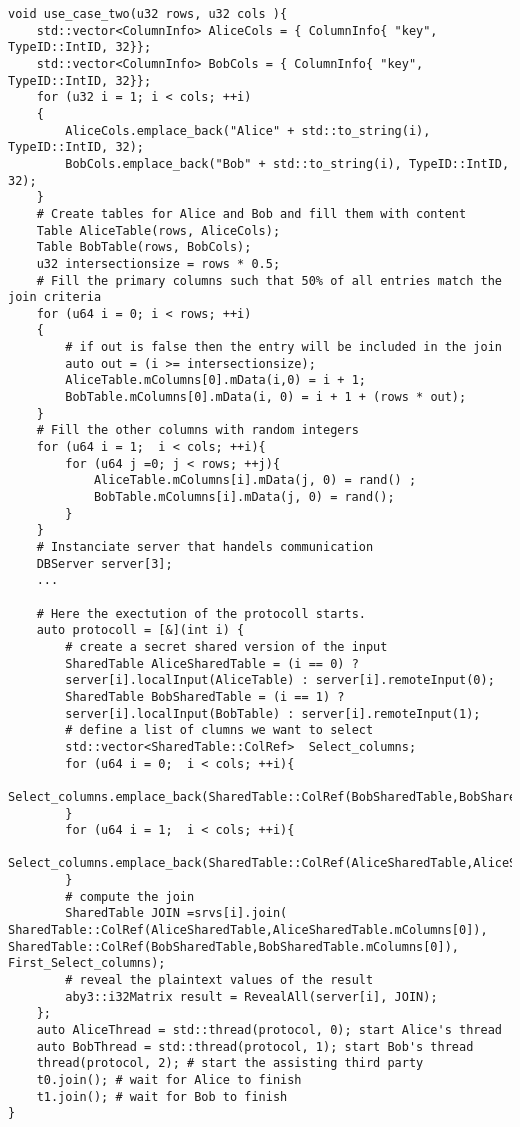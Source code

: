 \begin{lstlisting}[caption={Implementation of use case one using ABY3}]
void use_case_two(u32 rows, u32 cols ){
	std::vector<ColumnInfo> AliceCols = { ColumnInfo{ "key", TypeID::IntID, 32}};
	std::vector<ColumnInfo> BobCols = { ColumnInfo{ "key", TypeID::IntID, 32}};
	for (u32 i = 1; i < cols; ++i)
	{
		AliceCols.emplace_back("Alice" + std::to_string(i), TypeID::IntID, 32);
		BobCols.emplace_back("Bob" + std::to_string(i), TypeID::IntID, 32);
	}
	# Create tables for Alice and Bob and fill them with content
	Table AliceTable(rows, AliceCols);
	Table BobTable(rows, BobCols);
	u32 intersectionsize = rows * 0.5;
	# Fill the primary columns such that 50% of all entries match the join criteria 
	for (u64 i = 0; i < rows; ++i)
	{
		# if out is false then the entry will be included in the join
		auto out = (i >= intersectionsize);
		AliceTable.mColumns[0].mData(i,0) = i + 1;
		BobTable.mColumns[0].mData(i, 0) = i + 1 + (rows * out);
	}
	# Fill the other columns with random integers
	for (u64 i = 1;  i < cols; ++i){
		for (u64 j =0; j < rows; ++j){
			AliceTable.mColumns[i].mData(j, 0) = rand() ;
			BobTable.mColumns[i].mData(j, 0) = rand();	
		}
	}
	# Instanciate server that handels communication
	DBServer server[3]; 
	...

	# Here the exectution of the protocoll starts.
	auto protocoll = [&](int i) {
		# create a secret shared version of the input
		SharedTable AliceSharedTable = (i == 0) ? 
		server[i].localInput(AliceTable) : server[i].remoteInput(0);
		SharedTable BobSharedTable = (i == 1) ?
		server[i].localInput(BobTable) : server[i].remoteInput(1);
		# define a list of clumns we want to select
		std::vector<SharedTable::ColRef>  Select_columns;		
		for (u64 i = 0;  i < cols; ++i){
			Select_columns.emplace_back(SharedTable::ColRef(BobSharedTable,BobSharedTable.mColumns[i]));
		}
		for (u64 i = 1;  i < cols; ++i){
			Select_columns.emplace_back(SharedTable::ColRef(AliceSharedTable,AliceSharedTable.mColumns[i]));
		}
		# compute the join
		SharedTable JOIN =srvs[i].join( SharedTable::ColRef(AliceSharedTable,AliceSharedTable.mColumns[0]), SharedTable::ColRef(BobSharedTable,BobSharedTable.mColumns[0]), First_Select_columns);
		# reveal the plaintext values of the result
		aby3::i32Matrix result = RevealAll(server[i], JOIN); 
	};
	auto AliceThread = std::thread(protocol, 0); start Alice's thread
	auto BobThread = std::thread(protocol, 1); start Bob's thread
	thread(protocol, 2); # start the assisting third party
	t0.join(); # wait for Alice to finish
	t1.join(); # wait for Bob to finish
}
\end{lstlisting}

